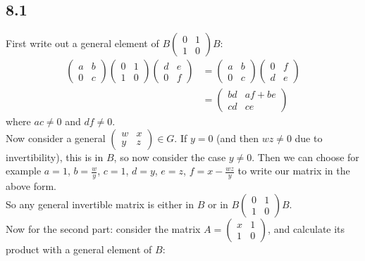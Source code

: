 \documentclass[12pt]{article}
\begin{document}
\subsection*{8.1}

First write out a general element of $B \begin{pmatrix} 0 & 1 \\ 1 & 0 \end{pmatrix} B$:
\begin{align*}
    \begin{pmatrix} a & b \\ 0 & c \end{pmatrix} \begin{pmatrix} 0 & 1 \\ 1 & 0 \end{pmatrix} \begin{pmatrix} d & e \\ 0 & f \end{pmatrix} &= \begin{pmatrix} a & b \\ 0 & c \end{pmatrix} \begin{pmatrix} 0 & f \\ d & e \end{pmatrix} \\
    &= \begin{pmatrix} bd & af+be \\ cd & ce \end{pmatrix}
\end{align*}
where $ac \neq 0$ and $df \neq 0$. \\
Now consider a general $\begin{pmatrix} w & x \\ y & z \end{pmatrix} \in G$. If $y=0$ (and then $wz \neq 0$ due to invertibility), this is in $B$, so now consider the case $y \neq 0$. Then we can choose for example $a=1$, $b=\frac{w}{y}$, $c=1$, $d=y$, $e=z$, $f=x-\frac{wz}{y}$ to write our matrix in the above form. \\
So any general invertible matrix is either in $B$ or in $B \begin{pmatrix} 0 & 1 \\ 1 & 0 \end{pmatrix} B$. \\
Now for the second part: consider the matrix $A=\begin{pmatrix} x & 1 \\ 1 & 0 \end{pmatrix}$, and calculate its product with a general element of $B$:
\end{document}
